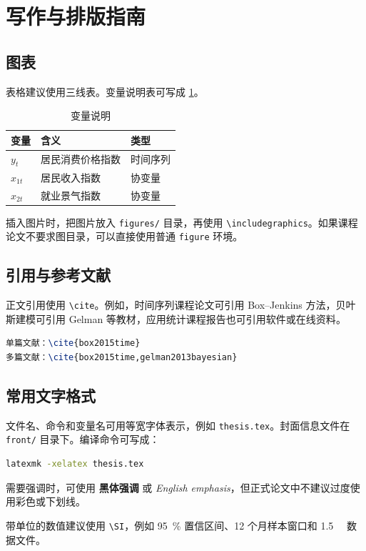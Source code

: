 \section{写作与排版指南}

\subsection{图表}

表格建议使用三线表。变量说明表可写成 \cref{tab:variables}。

\begin{table}[htbp]
  \centering
  \caption{变量说明}
  \label{tab:variables}
  \begin{tabular}{lll}
    \toprule
    变量 & 含义 & 类型 \\
    \midrule
    \(y_t\) & 居民消费价格指数 & 时间序列 \\
    \(x_{1t}\) & 居民收入指数 & 协变量 \\
    \(x_{2t}\) & 就业景气指数 & 协变量 \\
    \bottomrule
  \end{tabular}
\end{table}

插入图片时，把图片放入 \texttt{figures/} 目录，再使用 \verb|\includegraphics|。如果课程论文不要求图目录，可以直接使用普通 \texttt{figure} 环境。

\subsection{引用与参考文献}

正文引用使用 \verb|\cite|。例如，时间序列课程论文可引用 Box--Jenkins 方法\cite{box2015time}，贝叶斯建模可引用 Gelman 等教材\cite{gelman2013bayesian}，应用统计课程报告也可引用软件或在线资料\cite{rmanual2026}。

\begin{lstlisting}[language=TeX]
单篇文献：\cite{box2015time}
多篇文献：\cite{box2015time,gelman2013bayesian}
\end{lstlisting}

\subsection{常用文字格式}

文件名、命令和变量名可用等宽字体表示，例如 \texttt{thesis.tex}。封面信息文件在 \texttt{front/} 目录下。编译命令可写成：

\begin{lstlisting}[language=bash]
latexmk -xelatex thesis.tex
\end{lstlisting}

需要强调时，可使用 \textbf{黑体强调} 或 \emph{English emphasis}，但正式论文中不建议过度使用彩色或下划线。

带单位的数值建议使用 \verb|\SI|，例如 \SI{95}{\percent} 置信区间、12 个月样本窗口和 \SI{1.5}{\giga\byte} 数据文件。
